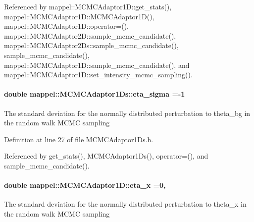 Referenced by mappel\+::\+M\+C\+M\+C\+Adaptor1\+D\+::get\+\_\+stats(), mappel\+::\+M\+C\+M\+C\+Adaptor1\+D\+::\+M\+C\+M\+C\+Adaptor1\+D(), mappel\+::\+M\+C\+M\+C\+Adaptor1\+D\+::operator=(), mappel\+::\+M\+C\+M\+C\+Adaptor2\+D\+::sample\+\_\+mcmc\+\_\+candidate(), mappel\+::\+M\+C\+M\+C\+Adaptor2\+Ds\+::sample\+\_\+mcmc\+\_\+candidate(), sample\+\_\+mcmc\+\_\+candidate(), mappel\+::\+M\+C\+M\+C\+Adaptor1\+D\+::sample\+\_\+mcmc\+\_\+candidate(), and mappel\+::\+M\+C\+M\+C\+Adaptor1\+D\+::set\+\_\+intensity\+\_\+mcmc\+\_\+sampling().

\paragraph[{\texorpdfstring{eta\+\_\+sigma}{eta_sigma}}]{\setlength{\rightskip}{0pt plus 5cm}double mappel\+::\+M\+C\+M\+C\+Adaptor1\+Ds\+::eta\+\_\+sigma =-\/1\hspace{0.3cm}{\ttfamily [protected]}}\hypertarget{classmappel_1_1MCMCAdaptor1Ds_adecf7d63c176c03493f914b544895c1c}{}\label{classmappel_1_1MCMCAdaptor1Ds_adecf7d63c176c03493f914b544895c1c}
The standard deviation for the normally distributed perturbation to theta\+\_\+bg in the random walk M\+C\+MC sampling 

Definition at line 27 of file M\+C\+M\+C\+Adaptor1\+Ds.\+h.



Referenced by get\+\_\+stats(), M\+C\+M\+C\+Adaptor1\+Ds(), operator=(), and sample\+\_\+mcmc\+\_\+candidate().

\paragraph[{\texorpdfstring{eta\+\_\+x}{eta_x}}]{\setlength{\rightskip}{0pt plus 5cm}double mappel\+::\+M\+C\+M\+C\+Adaptor1\+D\+::eta\+\_\+x =0\hspace{0.3cm}{\ttfamily [protected]}, {\ttfamily [inherited]}}\hypertarget{classmappel_1_1MCMCAdaptor1D_ae5787e38c9cef6168acf6fc5d3216693}{}\label{classmappel_1_1MCMCAdaptor1D_ae5787e38c9cef6168acf6fc5d3216693}
The standard deviation for the normally distributed perturbation to theta\+\_\+x in the random walk M\+C\+MC sampling 

